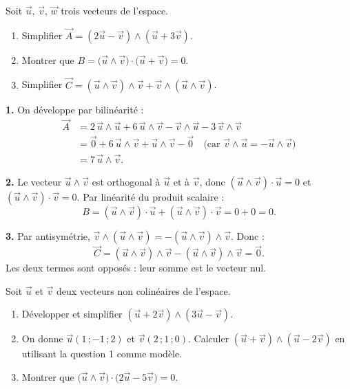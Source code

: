 \documentclass[11pt]{article}
\begin{document}
\begin{exoresolu}
Soit $\vec{u}$, $\vec{v}$, $\vec{w}$ trois vecteurs de l'espace.
\begin{enumerate}
\item Simplifier $\vec{A}=(2\vec{u}-\vec{v})\wedge(\vec{u}+3\vec{v})$.
\item Montrer que $B=\bigl(\vec{u}\wedge\vec{v}\bigr)\cdot\bigl(\vec{u}+\vec{v}\bigr)=0$.
\item Simplifier $\vec{C}=(\vec{u}\wedge\vec{v})\wedge\vec{v}+\vec{v}\wedge(\vec{u}\wedge\vec{v})$.
\end{enumerate}
\tcblower
\textbf{1.} On développe par bilinéarité :
\begin{align*}
\vec{A}
&= 2\,\vec{u}\wedge\vec{u}+6\,\vec{u}\wedge\vec{v}-\vec{v}\wedge\vec{u}-3\,\vec{v}\wedge\vec{v}\\
&= \vec{0}+6\,\vec{u}\wedge\vec{v}+\vec{u}\wedge\vec{v}-\vec{0}
\quad\text{(car }\vec{v}\wedge\vec{u}=-\vec{u}\wedge\vec{v}\text{)}\\
&= 7\,\vec{u}\wedge\vec{v}.
\end{align*}

\textbf{2.} Le vecteur $\vec{u}\wedge\vec{v}$ est orthogonal à $\vec{u}$ et à $\vec{v}$, donc $(\vec{u}\wedge\vec{v})\cdot\vec{u}=0$ et $(\vec{u}\wedge\vec{v})\cdot\vec{v}=0$. Par linéarité du produit scalaire :
\[
B=(\vec{u}\wedge\vec{v})\cdot\vec{u}+(\vec{u}\wedge\vec{v})\cdot\vec{v}=0+0=0.
\]

\textbf{3.} Par antisymétrie, $\vec{v}\wedge(\vec{u}\wedge\vec{v})=-(\vec{u}\wedge\vec{v})\wedge\vec{v}$. Donc :
\[
\vec{C}=(\vec{u}\wedge\vec{v})\wedge\vec{v}-(\vec{u}\wedge\vec{v})\wedge\vec{v}=\vec{0}.
\]
Les deux termes sont opposés : leur somme est le vecteur nul.
\end{exoresolu}

\begin{exercice}
Soit $\vec{u}$ et $\vec{v}$ deux vecteurs non colinéaires de l'espace.
\begin{enumerate}
\item Développer et simplifier $(\vec{u}+2\vec{v})\wedge(3\vec{u}-\vec{v})$.
\item On donne $\vec{u}(1\,;-1\,;2)$ et $\vec{v}(2\,;1\,;0)$. Calculer $(\vec{u}+\vec{v})\wedge(\vec{u}-2\vec{v})$ en utilisant la question 1 comme modèle.
\item Montrer que $\bigl(\vec{u}\wedge\vec{v}\bigr)\cdot\bigl(2\vec{u}-5\vec{v}\bigr)=0$.
\end{enumerate}
\end{exercice}
\end{document}
